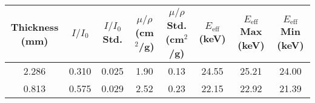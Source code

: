 \begin{tabularx}{1.2\textwidth}{cccccccc}
    \toprule
    Thickness (mm) & $I/I_0$ &  $I/I_0$ Std. &  $\mu/\rho$ (cm$^2$/g) &  $\mu/\rho$ Std. (cm$^2$/g) &  $E_{\text{eff}}$ (keV) &  $E_{\text{eff}}$ Max (keV) &  $E_{\text{eff}}$ Min (keV) \\
    \midrule
    2.286          & 0.310   &  0.025        &  1.90                  &     0.13                    &   24.55                 &     25.21                   &   24.00   \\
    0.813          & 0.575   &  0.029        &  2.52                  &     0.23                    &   22.15                 &     22.92                   &   21.39   \\
    \bottomrule
\end{tabularx}
